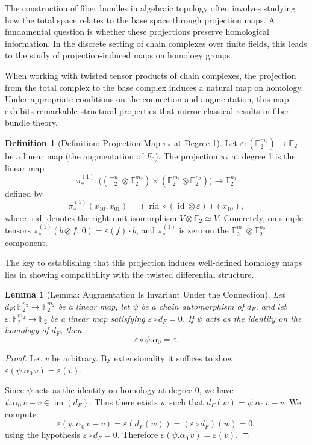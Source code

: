 \documentclass[11pt]{article}
\theoremstyle{plain}
\newtheorem*{lemma}{Lemma}
\theoremstyle{definition}
\newtheorem*{definition}{Definition}
\theoremstyle{remark}
\begin{document}
The construction of fiber bundles in algebraic topology often involves studying how the total space relates to the base space through projection maps. A fundamental question is whether these projections preserve homological information. In the discrete setting of chain complexes over finite fields, this leads to the study of projection-induced maps on homology groups.

When working with twisted tensor products of chain complexes, the projection from the total complex to the base complex induces a natural map on homology. Under appropriate conditions on the connection and augmentation, this map exhibits remarkable structural properties that mirror classical results in fiber bundle theory.

\begin{definition}[Definition: Projection Map $\pi_*$ at Degree 1]
Let $\varepsilon : (\mathbb{F}_2^{m_2}) \to \mathbb{F}_2$ be a linear map (the augmentation of $F_0$).
The projection $\pi_*$ at degree 1 is the linear map
\[
\pi_*^{(1)} : \bigl((\mathbb{F}_2^{n_1} \otimes \mathbb{F}_2^{m_2}) \times (\mathbb{F}_2^{m_1} \otimes \mathbb{F}_2^{n_2})\bigr) \longrightarrow \mathbb{F}_2^{n_1}
\]
defined by
\[
\pi_*^{(1)}(x_{10}, x_{01}) = (\operatorname{rid} \circ (\operatorname{id} \otimes \varepsilon))(x_{10}),
\]
where $\operatorname{rid}$ denotes the right-unit isomorphism $V \otimes \mathbb{F}_2 \simeq V$.
Concretely, on simple tensors $\pi_*^{(1)}(b \otimes f,\, 0) = \varepsilon(f) \cdot b$, and $\pi_*^{(1)}$ is zero on the $\mathbb{F}_2^{m_1} \otimes \mathbb{F}_2^{n_2}$ component.
\end{definition}

The key to establishing that this projection induces well-defined homology maps lies in showing compatibility with the twisted differential structure.

\begin{lemma}[Lemma: Augmentation Is Invariant Under the Connection]
Let $d_F : \mathbb{F}_2^{n_2} \to \mathbb{F}_2^{m_2}$ be a linear map, let $\psi$ be a chain automorphism of $d_F$, and let $\varepsilon : \mathbb{F}_2^{m_2} \to \mathbb{F}_2$ be a linear map satisfying $\varepsilon \circ d_F = 0$. If $\psi$ acts as the identity on the homology of $d_F$, then
\[
\varepsilon \circ \psi.\alpha_0 = \varepsilon.
\]
\end{lemma}

\begin{proof}
Let $v$ be arbitrary. By extensionality it suffices to show $\varepsilon(\psi.\alpha_0\, v) = \varepsilon(v)$.

Since $\psi$ acts as the identity on homology at degree 0, we have $\psi.\alpha_0\, v - v \in \operatorname{im}(d_F)$. Thus there exists $w$ such that $d_F(w) = \psi.\alpha_0\, v - v$. We compute:
\[
\varepsilon(\psi.\alpha_0\, v - v) = \varepsilon(d_F(w)) = (\varepsilon \circ d_F)(w) = 0,
\]
using the hypothesis $\varepsilon \circ d_F = 0$. Therefore $\varepsilon(\psi.\alpha_0\, v) = \varepsilon(v)$.
\end{proof}
\end{document}
